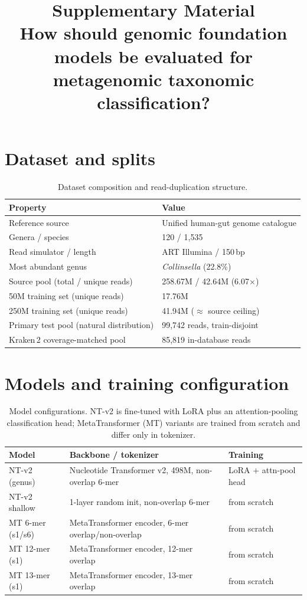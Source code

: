 \documentclass[11pt]{article}
\title{\bfseries Supplementary Material\\[2pt]
\large How should genomic foundation models be evaluated for metagenomic
taxonomic classification?}
\date{}
\begin{document}
\maketitle

\section{Dataset and splits}
\begin{table}[h]
\centering
\caption{Dataset composition and read-duplication structure.}
\small
\begin{tabularx}{\linewidth}{@{}Xl@{}}
\toprule
Property & Value \\
\midrule
Reference source & Unified human-gut genome catalogue \\
Genera / species & 120 / 1{,}535 \\
Read simulator / length & ART Illumina / 150\,bp \\
Most abundant genus & \emph{Collinsella} (22.8\%) \\
Source pool (total / unique reads) & 258.67M / 42.64M (6.07$\times$) \\
50M training set (unique reads) & 17.76M \\
250M training set (unique reads) & 41.94M ($\approx$ source ceiling) \\
Primary test pool (natural distribution) & 99{,}742 reads, train-disjoint \\
Kraken\,2 coverage-matched pool & 85{,}819 in-database reads \\
\bottomrule
\end{tabularx}
\end{table}

\section{Models and training configuration}
\begin{table}[h]
\centering
\caption{Model configurations. NT-v2 is fine-tuned with LoRA plus an
attention-pooling classification head; MetaTransformer (MT) variants are
trained from scratch and differ only in tokenizer.}
\small
\begin{tabularx}{\linewidth}{@{}lXl@{}}
\toprule
Model & Backbone / tokenizer & Training \\
\midrule
NT-v2 (genus) & Nucleotide Transformer v2, 498M, non-overlap 6-mer & LoRA + attn-pool head \\
NT-v2 shallow & 1-layer random init, non-overlap 6-mer & from scratch \\
MT 6-mer (s1/s6) & MetaTransformer encoder, 6-mer overlap/non-overlap & from scratch \\
MT 12-mer (s1) & MetaTransformer encoder, 12-mer overlap & from scratch \\
MT 13-mer (s1) & MetaTransformer encoder, 13-mer overlap & from scratch \\
\bottomrule
\end{tabularx}
\end{table}
\end{document}
